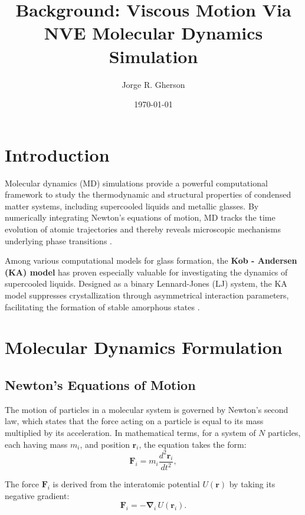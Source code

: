 \documentclass{article}
\title{Background: Viscous Motion Via NVE Molecular Dynamics Simulation}
\author{Jorge R. Gherson}
\date{\today}
\begin{document}
\maketitle

\section{Introduction}
Molecular dynamics (MD) simulations provide a powerful computational framework to study the thermodynamic and structural properties of 
condensed matter systems, including supercooled liquids and metallic glasses. By numerically integrating Newton's equations of motion, 
MD tracks the time evolution of atomic trajectories and thereby reveals microscopic mechanisms underlying phase transitions 
\cite{allen1989computer, frenkel2002understanding}. 

Among various computational models for glass formation, the  \textbf{Kob - Andersen (KA) model} has proven especially valuable for 
investigating the dynamics of supercooled liquids. Designed as a binary Lennard-Jones (LJ) system, 
the KA model suppresses crystallization through asymmetrical 
interaction parameters, facilitating the formation of stable amorphous 
states \cite{kob1994scaling, kob1995testing}.

\section{Molecular Dynamics Formulation}
\subsection{Newton's Equations of Motion}
The motion of particles in a molecular system is governed by Newton’s second law, which states that the force acting on a particle is 
equal to its mass multiplied by its acceleration. In mathematical terms, for a system of \(N\) particles, each having mass \(m_i\), 
and position \(\mathbf{r}_i\), the equation takes the form:
\begin{equation}
    \mathbf{F}_i = m_i \frac{d^2 \mathbf{r}_i}{dt^2},
\end{equation}

The force \(\mathbf{F}_i\) is derived from the interatomic potential \(U(\mathbf{r})\) by taking its negative gradient:
\begin{equation} \label{eq:force}
    \mathbf{F}_i = -\mathbf{\nabla}_i \, U(\mathbf{r}_i).
\end{equation}
\end{document}
